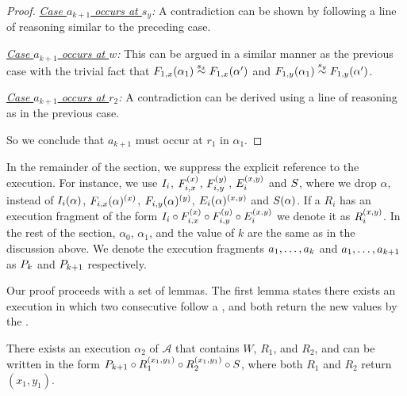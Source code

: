 \begin{proof}
\emph{ \underline{Case $a_{k+1}$ occurs at $s_y$}:} A  contradiction can be shown by following a line of reasoning similar to the  preceding case.

\emph{\underline{Case $a_{k+1}$ occurs at $w$}:}
This can be argued in a similar manner as the previous case with the trivial fact that $\frage{F_{1,x}}{\alpha_1}{} \stackrel{s_x}{\sim} \frage{F_{1,x}}{\alpha'}{}$ and $\frage{F_{1,y}}{\alpha_1}{} \stackrel{s_y}{\sim} \frage{F_{1,y}}{\alpha'}{}$.


\emph{\underline{Case $a_{k+1}$ occurs at $r_2$}:} 
A contradiction can be derived using a line of  reasoning as in the previous case.

So we conclude that $a_{k+1}$ must occur at $r_1$ in $\alpha_1$.
\end{proof}

In the remainder of the section, we suppress the explicit reference to the execution. For instance, we use $\fragt{I_i}{\alpha}{}$, $\fragt{F_{i,x}}{\alpha}{x}$, 
$\fragt{F_{i,y}}{\alpha}{y}$, $\fragt{E_i}{\alpha}{x, y}$ and $ \fragt{S}{\alpha}{}$, where we drop $\alpha$, 
instead of $\frage{I_i}{\alpha}{}$, $\frage{F_{i,x}}{\alpha}{x}$, 
$\frage{F_{i,y}}{\alpha}{y}$, $\frage{E_i}{\alpha}{x, y} $ and $ \frage{S}{\alpha}{}$.
If a 
\rot{} $R_i$ has an  execution fragment of the form 
$\fragt{I_i}{\alpha}{} \circ \fragt{F_{i,x}}{\alpha}{x} \circ 
\fragt{F_{i,y}}{\alpha}{y} \circ \fragt{E_i}{\alpha}{x, y} $
we denote it  as  $\fragt{R_i}{}{x, y}$. 
In the rest of the section, $\alpha_0$, $\alpha_1$, and the value of $k$ are the same as in the discussion above. We denote  the execution fragments  $\finiteprefixt{k}{k}$ and $\finiteprefixt{k}{k+1}$ as 
$\finiteprefixA{k}{k}$ and $\finiteprefixA{k}{k+1}$ respectively.

Our proof proceeds with a set of lemmas. 
The first lemma states there exists an execution in which two consecutive \rots{} follow a \wot{}, and both \rots{}
return the new values by the \wot{}.

\begin{lemma} \label{lem:exec3_alpha2} 
\sloppy There exists an execution $\alpha_2$  of $\mathcal{A}$ that contains 
$W$, $R_1$, and $R_2$, and can be written in the form 
$\finiteprefixA{k}{k+1} \circ 
\frage{R_1}{}{x_1, y_1}
 \circ
 \frage{R_2}{}{x_1, y_1}
\circ \fragt{S}{\alpha_2}{}$, where both $R_1$ and $R_2$ return $(x_1, y_1)$.
\end{lemma}

